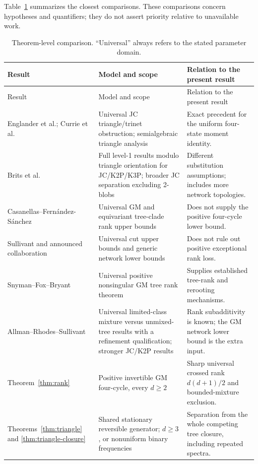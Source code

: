 \documentclass[11pt]{article}
\theoremstyle{definition}
\theoremstyle{remark}
\begin{document}
Table~\ref{tab:comparison} summarizes the closest comparisons. These
comparisons concern hypotheses and quantifiers; they do not assert priority
relative to unavailable work.

\begin{longtable}{@{}p{}p{}p{}@{}}
\caption{Theorem-level comparison. ``Universal'' always refers to the
stated parameter domain.}\label{tab:comparison}\\
\toprule
Result & Model and scope & Relation to the present result\\
\midrule
\endfirsthead
\toprule Result & Model and scope & Relation to the present result\\\midrule
\endhead
Englander et al.; Currie et al.\ \cite{Englander2025,Currie2026}
& Universal JC triangle/trinet obstruction; semialgebraic triangle analysis
& Exact precedent for the uniform four-state moment identity.\\[4pt]
Brits et al.\ \cite{Brits2026}
& Full level-1 results modulo triangle orientation for JC/K2P/K3P; broader JC separation excluding 2-blobs
& Different substitution assumptions; includes more network topologies.\\[4pt]
Casanellas--Fern\'andez-S\'anchez\ \cite{CFS2021,CFS2025}
& Universal GM and equivariant tree-clade rank upper bounds
& Does not supply the positive four-cycle lower bound.\\[4pt]
Sullivant and announced collaboration\ \cite{Sullivant2026,SullivantIMSI2025}
& Universal cut upper bounds and generic network lower bounds
& Does not rule out positive exceptional rank loss.\\[4pt]
Snyman--Fox--Bryant\ \cite{Snyman2023}
& Universal positive nonsingular GM tree rank theorem
& Supplies established tree-rank and rerooting mechanisms.\\[4pt]
Allman--Rhodes--Sullivant\ \cite{ARS2012}
& Universal limited-class mixture versus unmixed-tree results with a refinement qualification; stronger JC/K2P results
& Rank subadditivity is known; the GM network lower bound is the extra input.\\[4pt]
Theorem~\ref{thm:rank}
& Positive invertible GM four-cycle, every $d\ge2$
& Sharp universal crossed rank $d(d+1)/2$ and bounded-mixture exclusion.\\[4pt]
Theorems~\ref{thm:triangle} and \ref{thm:triangle-closure}
& Shared stationary reversible generator; $d\ge3$, or nonuniform binary frequencies
& Separation from the whole competing tree closure, including repeated spectra.\\
\bottomrule
\end{longtable}
\end{document}
